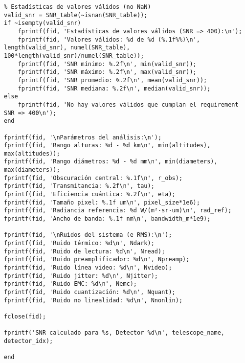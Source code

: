 \begin{verbatim}
% Estadísticas de valores válidos (no NaN)
valid_snr = SNR_table(~isnan(SNR_table));
if ~isempty(valid_snr)
    fprintf(fid, 'Estadísticas de valores válidos (SNR => 400):\n');
    fprintf(fid, 'Valores válidos: %d de %d (%.1f%%)\n', length(valid_snr), numel(SNR_table), 100*length(valid_snr)/numel(SNR_table));
    fprintf(fid, 'SNR mínimo: %.2f\n', min(valid_snr));
    fprintf(fid, 'SNR máximo: %.2f\n', max(valid_snr));
    fprintf(fid, 'SNR promedio: %.2f\n', mean(valid_snr));
    fprintf(fid, 'SNR mediana: %.2f\n', median(valid_snr));
else
    fprintf(fid, 'No hay valores válidos que cumplan el requirement SNR => 400\n');
end

fprintf(fid, '\nParámetros del análisis:\n');
fprintf(fid, 'Rango alturas: %d - %d km\n', min(altitudes), max(altitudes));
fprintf(fid, 'Rango diámetros: %d - %d mm\n', min(diameters), max(diameters));
fprintf(fid, 'Obscuración central: %.1f\n', r_obs);
fprintf(fid, 'Transmitancia: %.2f\n', tau);
fprintf(fid, 'Eficiencia cuántica: %.2f\n', eta);
fprintf(fid, 'Tamaño pixel: %.1f um\n', pixel_size*1e6);
fprintf(fid, 'Radiancia referencia: %d W/(m²·sr·um)\n', rad_ref);
fprintf(fid, 'Ancho de banda: %.1f nm\n', bandwidth_m*1e9);

fprintf(fid, '\nRuidos del sistema (e RMS):\n');
fprintf(fid, 'Ruido térmico: %d\n', Ndark);
fprintf(fid, 'Ruido de lectura: %d\n', Nread);
fprintf(fid, 'Ruido preamplificador: %d\n', Npreamp);
fprintf(fid, 'Ruido línea video: %d\n', Nvideo);
fprintf(fid, 'Ruido jitter: %d\n', Njitter);
fprintf(fid, 'Ruido EMC: %d\n', Nemc);
fprintf(fid, 'Ruido cuantización: %d\n', Nquant);
fprintf(fid, 'Ruido no linealidad: %d\n', Nnonlin);

fclose(fid);

fprintf('SNR calculado para %s, Detector %d\n', telescope_name, detector_idx);

end

\end{verbatim}
\newpage
